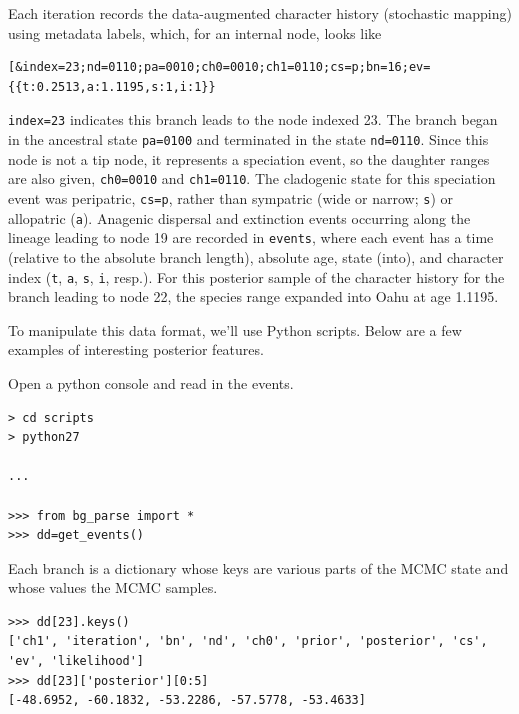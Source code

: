 \documentclass[11pt]{article}
\begin{document}
Each iteration records the data-augmented character history (stochastic mapping) using metadata labels, which, for an internal node, looks like

\begin{snugshade}
\begin{lstlisting}
[&index=23;nd=0110;pa=0010;ch0=0010;ch1=0110;cs=p;bn=16;ev={{t:0.2513,a:1.1195,s:1,i:1}}
\end{lstlisting}
\end{snugshade}

{\tt index=23} indicates this branch leads to the node indexed 23.
The branch began in the ancestral state {\tt pa=0100} and terminated in the state {\tt nd=0110}.
Since this node is not a tip node, it represents a speciation event, so the daughter ranges are also given, {\tt ch0=0010} and {\tt ch1=0110}.
The cladogenic state for this speciation event was peripatric, {\tt cs=p}, rather than sympatric (wide or narrow; {\tt s}) or allopatric ({\tt a}).
Anagenic dispersal and extinction events occurring along the lineage leading to node 19 are recorded in {\tt events}, where each event has a time (relative to the absolute branch length), absolute age, state (into), and character index ({\tt t}, {\tt a}, {\tt s}, {\tt i}, resp.).
For this posterior sample of the character history for the branch leading to node 22, the species range expanded into Oahu at age 1.1195.

To manipulate this data format, we'll use Python scripts. Below are a few examples of interesting posterior features.

Open a python console and read in the events.

\begin{snugshade}
\begin{lstlisting}
> cd scripts
> python27

...

>>> from bg_parse import *
>>> dd=get_events()
\end{lstlisting}
\end{snugshade}


Each branch is a dictionary whose keys are various parts of the MCMC state and whose values the MCMC samples.
\begin{snugshade}
\begin{lstlisting}
>>> dd[23].keys()
['ch1', 'iteration', 'bn', 'nd', 'ch0', 'prior', 'posterior', 'cs', 'ev', 'likelihood']
>>> dd[23]['posterior'][0:5]
[-48.6952, -60.1832, -53.2286, -57.5778, -53.4633]
\end{lstlisting}
\end{snugshade}
\end{document}
